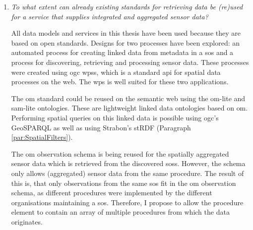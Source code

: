 \begin{enumerate}
However, the down side of the a detailed semantic knowledge base is that more data has to be transferred over the internet. First a \ac{sparql} has to be made with a spatial, which includes verbose \ac{wkt} geometries. Then an \ac{rdf} document containing detailed information about each sensor is return, based on which \ac{sos} requests are performed. If only the \aclp{sos} are returned that have sensors inside a certain bounding box, both the \ac{sparql} request and response are smaller. The detailed spatial query is then performed by the \aclp{sos}. 

Still, discovering sensors is only a matter of seconds using the a detailed semantic knowledge base. Automatically retrieving sensor data can take up to a couple minutes depending on the amount of sensors for which data is requested and the temporal range. However, it should be noted that performance optimization is out of the scope of this thesis. It is likely that this can still be improved significantly (see Chapter \ref{chap:futureResearch}).              

\item \textit{To what extent can already existing standards for retrieving data be (re)used for a service that supplies integrated and aggregated sensor data?}%

All data models and services in this thesis have been used because they are based on open standards. Designs for two processes have been explored: an automated process for creating linked data from metadata in a \ac{sos} and a process for discovering, retrieving and processing sensor data. These processes were created using \ac{ogc} \aclp{wps}, which is a standard \ac{api} for spatial data processes on the web. The \ac{wps} is well suited for these two applications.

The \ac{om} standard could be reused on the semantic web using the om-lite and sam-lite ontologies. These are lightweight linked data ontologies based on \ac{om}. Performing spatial queries on this linked data is possible using \ac{ogc}'s GeoSPARQL as well as using Strabon's stRDF (Paragraph \ref{par:SpatialFilters}).

The \ac{om} observation schema is being reused for the spatially aggregated sensor data which is retrieved from the discovered \aclp{sos}. However, the schema only allows (aggregated) sensor data from the same procedure. The result of this is, that only observations from the same \ac{sos} fit in the \ac{om} observation schema, as different procedures were implemented by the different organisations maintaining a \ac{sos}. Therefore, I propose to allow the procedure element to contain an array of multiple procedures from which the data originates. 
\end{enumerate}


